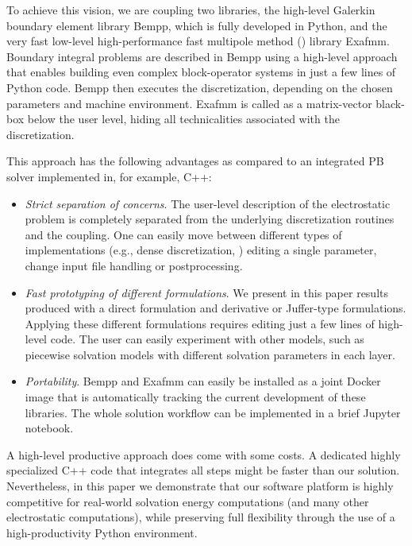 To achieve this vision, we are coupling two libraries, the high-level Galerkin boundary element library Bempp, which is fully developed in Python, and the very fast low-level high-performance fast multipole method (\fmm) library Exafmm. 
Boundary integral problems are described in Bempp using a high-level approach that enables building even complex block-operator systems in just a few lines of Python code. Bempp then executes the discretization, depending on the chosen parameters and machine environment. 
Exafmm is called as a matrix-vector black-box below the user level, hiding all technicalities associated with the discretization.

This approach has the following advantages as compared to an integrated PB solver implemented in, for example, C++:
\begin{itemize}
	\item \textit{Strict separation of concerns}. The user-level description of the electrostatic problem is completely separated from the underlying discretization routines and the \fmm coupling. One can easily move between different types of implementations (e.g., dense discretization, \fmm) editing a single parameter, change input file handling or postprocessing.
	\item \textit{Fast prototyping of different formulations}. We present in this paper results produced with a direct formulation and derivative or Juffer-type formulations. Applying these different formulations requires editing just a few lines of high-level code. The user can easily experiment with other models, such as piecewise solvation models with different solvation parameters in each layer.
	\item \textit{Portability}. Bempp and Exafmm can easily be installed as a joint Docker image that is automatically tracking the current development of these libraries. The whole solution workflow can be implemented in a brief Jupyter notebook.
\end{itemize}
A high-level productive approach does come with some costs. A dedicated highly specialized C++ code that integrates all steps might be faster than our solution. Nevertheless, in this paper we demonstrate that our software platform is highly competitive for real-world solvation energy computations (and many other electrostatic computations), while preserving full flexibility through the use of a high-productivity Python environment.

